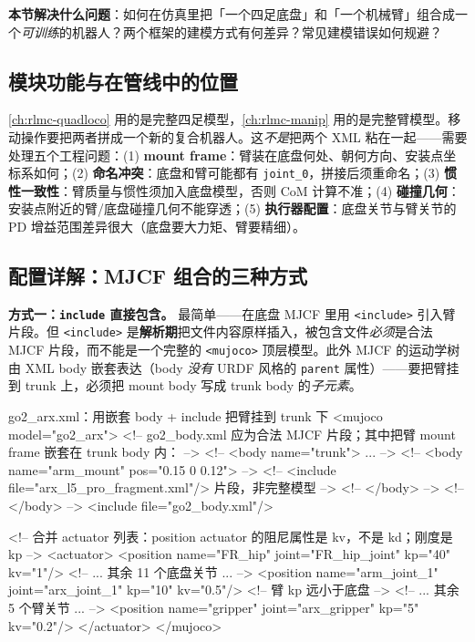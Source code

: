 \textbf{本节解决什么问题}：如何在仿真里把「一个四足底盘」和「一个机械臂」组合成一个\emph{可训练}的机器人？两个框架的建模方式有何差异？常见建模错误如何规避？

\subsection{模块功能与在管线中的位置}
\label{sec:rlmc-lm-asset-role}

\cref{ch:rlmc-quadloco} 用的是完整四足模型，\cref{ch:rlmc-manip} 用的是完整臂模型。移动操作要把两者拼成一个新的复合机器人。这\emph{不是}把两个 XML 粘在一起——需要处理五个工程问题：(1) \textbf{mount frame}：臂装在底盘何处、朝何方向、安装点坐标系如何；(2) \textbf{命名冲突}：底盘和臂可能都有 \verb|joint_0|，拼接后须重命名；(3) \textbf{惯性一致性}：臂质量与惯性须加入底盘模型，否则 CoM 计算不准；(4) \textbf{碰撞几何}：安装点附近的臂/底盘碰撞几何不能穿透；(5) \textbf{执行器配置}：底盘关节与臂关节的 PD 增益范围差异很大（底盘要大力矩、臂要精细）。

\subsection{配置详解：MJCF 组合的三种方式}
\label{sec:rlmc-lm-mjcf}

\textbf{方式一：\texttt{include} 直接包含。} 最简单——在底盘 MJCF 里用 \verb|<include>| 引入臂片段。但 \verb|<include>| 是\textbf{解析期}把文件内容原样插入，被包含文件\emph{必须}是合法 MJCF 片段，而不能是一个完整的 \verb|<mujoco>| 顶层模型。此外 MJCF 的运动学树由 XML body 嵌套表达（body \emph{没有} URDF 风格的 \verb|parent| 属性）——要把臂挂到 trunk 上，必须把 mount body 写成 trunk body 的\emph{子元素}。

\begin{codebox}[text]{go2\_arx.xml：用嵌套 body + include 把臂挂到 trunk 下}
<mujoco model="go2_arx">
  <!-- go2_body.xml 应为合法 MJCF 片段；其中把臂 mount frame 嵌套在 trunk body 内： -->
  <!--   <body name="trunk"> ...                                              -->
  <!--     <body name="arm_mount" pos="0.15 0 0.12">                          -->
  <!--       <include file="arx_l5_pro_fragment.xml"/>   片段，非完整模型      -->
  <!--     </body>                                                            -->
  <!--   </body>                                                             -->
  <include file="go2_body.xml"/>

  <!-- 合并 actuator 列表：position actuator 的阻尼属性是 kv，不是 kd；刚度是 kp -->
  <actuator>
    <position name="FR_hip" joint="FR_hip_joint" kp="40" kv="1"/>
    <!-- ... 其余 11 个底盘关节 ... -->
    <position name="arm_joint_1" joint="arx_joint_1" kp="10" kv="0.5"/>  <!-- 臂 kp 远小于底盘 -->
    <!-- ... 其余 5 个臂关节 ... -->
    <position name="gripper" joint="arx_gripper" kp="5" kv="0.2"/>
  </actuator>
</mujoco>
\end{codebox}

